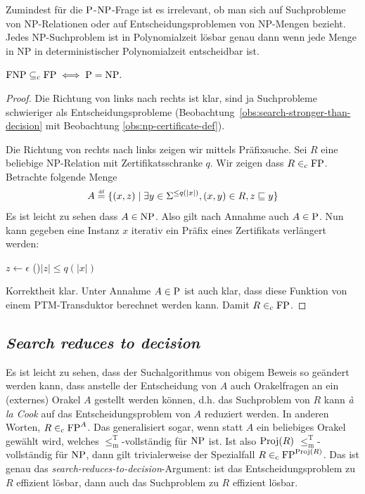 Zumindest für die $\P$-$\NP$-Frage ist es irrelevant, ob man sich auf Suchprobleme von NP-Relationen oder auf Entscheidungsproblemen von NP-Mengen bezieht. Jedes NP-Suchproblem ist in Polynomialzeit lösbar genau dann wenn jede Menge in NP in deterministischer Polynomialzeit entscheidbar ist.
\begin{lemma}\label{lemma:equiv-p-np-question}
    $\FNP\subseteqc \FP \iff \P = \NP.$
\end{lemma}
\begin{proof}
    Die Richtung von links nach rechts ist klar, sind ja Suchprobleme schwieriger als Entscheidungsprobleme (Beobachtung~\ref{obs:search-stronger-than-decision} mit Beobachtung \ref{obs:np-certificate-def}).

    Die Richtung von rechts nach links zeigen wir mittels Präfixsuche. Sei $R$ eine beliebige NP-Relation mit Zertifikatsschranke $q$. Wir zeigen dass $R\inc\FP$.
    Betrachte folgende Menge
    \[ A \defeq \{ (x,z) \mid \exists y\in\Sigma^{\leq q(|x|)}, (x,y)\in R, z\sqsubseteq y \} \]
    Es ist leicht zu sehen dass $A\in\NP$. Also gilt nach Annahme auch $A\in\P$.
    Nun kann gegeben eine Instanz $x$ iterativ ein Präfix eines Zertifikats verlängert werden:\\
    \begin{algorithm}[H]
        $z\gets\epsilon$\;
        \While(){$|z|\leq q(|x|)$}
        {
            \Else{\Reject}
        }
        \Reject
    \end{algorithm}
    \noindent
    Korrektheit klar.
    Unter Annahme $A\in\P$ ist auch klar, dass diese Funktion von einem PTM-Transduktor berechnet werden kann. Damit $R\inc\FP$.
\end{proof}

\subsection*{\emph{Search reduces to decision}}

Es ist leicht zu sehen, dass der Suchalgorithmus von obigem Beweis so geändert werden kann, dass anstelle der Entscheidung von $A$ auch Orakelfragen an ein (externes) Orakel $A$ gestellt werden können, d.h. das Suchproblem von $R$ kann \emph{à la Cook} auf das Entscheidungsproblem von $A$ reduziert werden. In anderen Worten, $R\inc \FP^A$. Das generalisiert sogar, wenn statt $A$ ein beliebiges Orakel gewählt wird, welches $\leq_\mathrm{m}^\mathrm{T}$-vollständig für $\NP$ ist. Ist also $\Proj(R)$ $\leq_\mathrm{m}^\mathrm{T}$-vollständig für $\NP$, dann gilt trivialerweise der Spezialfall $R\inc \FP^{\Proj(R)}$. Das ist genau das \emph{search-reduces-to-decision}-Argument: ist das Entscheidungsproblem zu $R$ effizient lösbar, dann auch das Suchproblem zu $R$ effizient lösbar.

